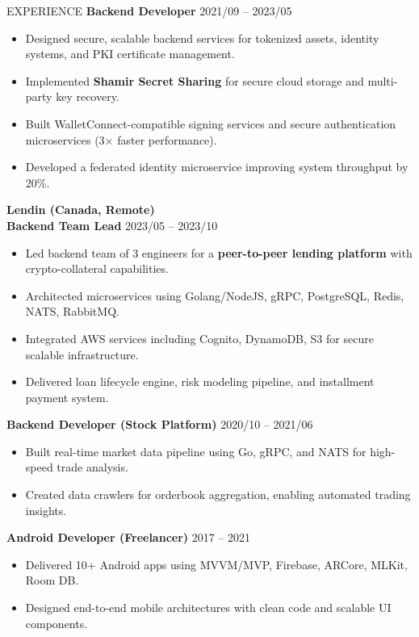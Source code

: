 \documentclass{resume}
\begin{document}
\begin{rSection}{EXPERIENCE}
\textbf{Backend Developer} \hfill 2021/09 -- 2023/05
\begin{itemize}
    \item Designed secure, scalable backend services for tokenized assets, identity systems, and PKI certificate management.
    \item Implemented \textbf{Shamir Secret Sharing} for secure cloud storage and multi-party key recovery.
    \item Built WalletConnect-compatible signing services and secure authentication microservices (3× faster performance).
    \item Developed a federated identity microservice improving system throughput by 20\%.
\end{itemize}

\textbf{Lendin (Canada, Remote)} \hfill \\
\textbf{Backend Team Lead} \hfill 2023/05 -- 2023/10
\begin{itemize}
    \item Led backend team of 3 engineers for a \textbf{peer-to-peer lending platform} with crypto-collateral capabilities.
    \item Architected microservices using Golang/NodeJS, gRPC, PostgreSQL, Redis, NATS, RabbitMQ.
    \item Integrated AWS services including Cognito, DynamoDB, S3 for secure scalable infrastructure.
    \item Delivered loan lifecycle engine, risk modeling pipeline, and installment payment system.
\end{itemize}

\textbf{Backend Developer (Stock Platform)} \hfill 2020/10 -- 2021/06
\begin{itemize}
    \item Built real-time market data pipeline using Go, gRPC, and NATS for high-speed trade analysis.
    \item Created data crawlers for orderbook aggregation, enabling automated trading insights.
\end{itemize}

\textbf{Android Developer (Freelancer)} \hfill 2017 -- 2021
\begin{itemize}
    \item Delivered 10+ Android apps using MVVM/MVP, Firebase, ARCore, MLKit, Room DB.
    \item Designed end-to-end mobile architectures with clean code and scalable UI components.
\end{itemize}

\end{rSection}
\end{document}
